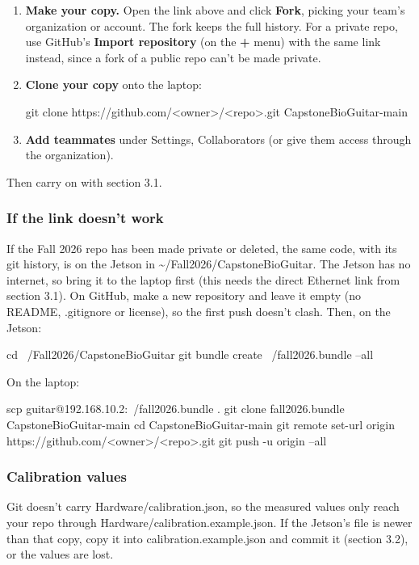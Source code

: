 \documentclass[11pt,letterpaper]{article}
\newcommand{\code}[1]{\textcolor{codeblue}{\ttfamily\smaller\relax #1}}
\begin{document}
\begin{enumerate}
  \item \textbf{Make your copy.} Open the link above and click \textbf{Fork}, picking your team's organization or account. The fork keeps the full history. For a private repo, use GitHub's \textbf{Import repository} (on the \textbf{+} menu) with the same link instead, since a fork of a public repo can't be made private.
  \item \textbf{Clone your copy} onto the laptop:
\begin{codeblock}
git clone https://github.com/<owner>/<repo>.git CapstoneBioGuitar-main
\end{codeblock}
  \item \textbf{Add teammates} under Settings, Collaborators (or give them access through the organization).
\end{enumerate}
Then carry on with section 3.1.

\subsubsection*{If the link doesn't work}
If the Fall 2026 repo has been made private or deleted, the same code, with its git history, is on the Jetson in \code{\textasciitilde{}/\allowbreak{}Fall2026/\allowbreak{}CapstoneBioGuitar}. The Jetson has no internet, so bring it to the laptop first (this needs the direct Ethernet link from section 3.1). On GitHub, make a new repository and leave it empty (no README, \code{.gitignore} or license), so the first push doesn't clash. Then, on the Jetson:

\begin{codeblock}
cd ~/Fall2026/CapstoneBioGuitar
git bundle create ~/fall2026.bundle --all
\end{codeblock}
On the laptop:

\begin{codeblock}
scp guitar@192.168.10.2:~/fall2026.bundle .
git clone fall2026.bundle CapstoneBioGuitar-main
cd CapstoneBioGuitar-main
git remote set-url origin https://github.com/<owner>/<repo>.git
git push -u origin --all
\end{codeblock}

\subsubsection*{Calibration values}
Git doesn't carry \code{Hardware/\allowbreak{}calibration.json}, so the measured values only reach your repo through \code{Hardware/\allowbreak{}calibration.example.json}. If the Jetson's file is newer than that copy, copy it into \code{calibration.example.json} and commit it (section 3.2), or the values are lost.
\end{document}
